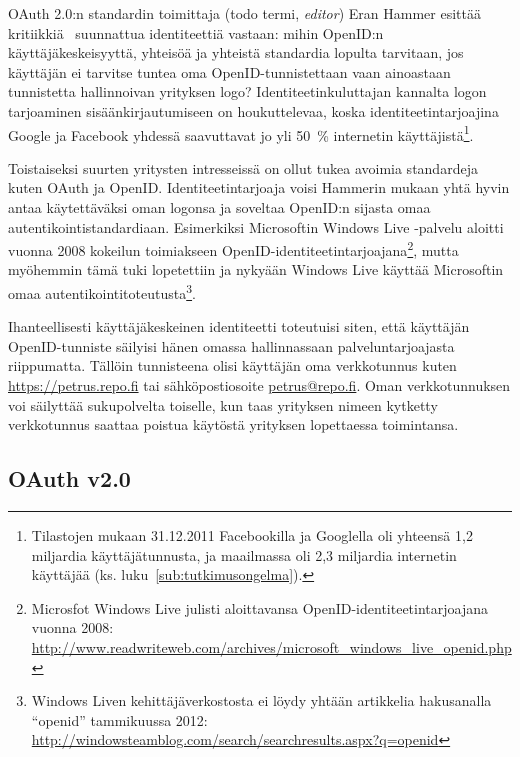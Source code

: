 \documentclass[finnish,gradu]{tktltiki}
\begin{document}
    OAuth 2.0:n standardin toimittaja (todo termi, \emph{editor}) Eran Hammer esittää kritiikkiä~\cite{hueniverse_openid_crisis} suunnattua identiteettiä vastaan: mihin OpenID:n käyttäjäkeskeisyyttä, yhteisöä ja yhteistä standardia lopulta tarvitaan, jos käyttäjän ei tarvitse tuntea oma OpenID-tunnistettaan vaan ainoastaan tunnistetta hallinnoivan yrityksen logo? Identiteetinkuluttajan kannalta logon tarjoaminen sisäänkirjautumiseen on houkuttelevaa, koska identiteetintarjoajina Google ja Facebook yhdessä saavuttavat jo yli 50~\% internetin käyttäjistä\footnote{Tilastojen mukaan 31.12.2011 Facebookilla ja Googlella oli yhteensä 1,2 miljardia käyttäjätunnusta, ja maailmassa oli 2,3 miljardia internetin käyttäjää (ks. luku~\ref{sub:tutkimusongelma}).}.

    Toistaiseksi suurten yritysten intresseissä on ollut tukea avoimia standardeja kuten OAuth ja OpenID. Identiteetintarjoaja voisi Hammerin mukaan yhtä hyvin antaa käytettäväksi oman logonsa ja soveltaa OpenID:n sijasta omaa autentikointistandardiaan. Esimerkiksi Microsoftin Windows Live -palvelu aloitti vuonna 2008  kokeilun toimiakseen OpenID-identiteetintarjoajana\footnote{Microsfot Windows Live julisti aloittavansa OpenID-identiteetintarjoajana vuonna 2008: \\ \url{http://www.readwriteweb.com/archives/microsoft_windows_live_openid.php}},
  mutta myöhemmin tämä tuki lopetettiin ja nykyään Windows Live käyttää Microsoftin omaa autentikointitoteutusta\footnote{Windows Liven kehittäjäverkostosta ei löydy yhtään artikkelia hakusanalla ``openid'' tammikuussa 2012: \url{http://windowsteamblog.com/search/searchresults.aspx?q=openid}}.

  Ihanteellisesti käyttäjäkeskeinen identiteetti toteutuisi siten, että käyttäjän OpenID-tunniste säilyisi hänen omassa hallinnassaan palveluntarjoajasta riippumatta. Tällöin tunnisteena olisi käyttäjän oma verkkotunnus kuten \url{https://petrus.repo.fi} tai sähköpostiosoite \url{petrus@repo.fi}. Oman verkkotunnuksen voi säilyttää sukupolvelta toiselle, kun taas yrityksen nimeen kytketty verkkotunnus saattaa poistua käytöstä yrityksen lopettaessa toimintansa.





  \subsection{OAuth v2.0} %
  \label{sub:oauth}
\end{document}
